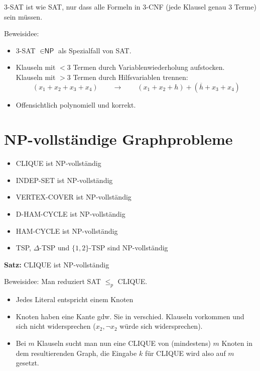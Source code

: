 \documentclass[a4paper,graphics,11pt]{article}
\begin{document}
3-SAT ist wie SAT, nur dass alle Formeln in 3-CNF (jede Klausel genau 3 Terme) sein müssen.

Beweisidee:
\begin{itemize}
    \item 3-SAT $\in \textsf{NP}$ als Spezialfall von SAT.
    \item Klauseln mit $< 3$ Termen durch Variablenwiederholung aufstocken.\\
        Klauseln mit $> 3$ Termen durch Hilfsvariablen trennen:
        $$
            (x_1 + x_2 + x_3 + x_4)
            \qquad\rightarrow\qquad
            (x_1 + x_2 + h) + (\overline{h} + x_3 + x_4)
        $$
    \item Offensichtlich polynomiell und korrekt.
\end{itemize}



\newpage



\section{\textsf{NP}-vollständige Graphprobleme}


\begin{itemize}
    \item CLIQUE ist \textsf{NP}-vollständig
    \item INDEP-SET ist \textsf{NP}-vollständig
    \item VERTEX-COVER ist \textsf{NP}-vollständig
    \item D-HAM-CYCLE ist \textsf{NP}-vollständig
    \item HAM-CYCLE ist \textsf{NP}-vollständig
    \item TSP, $\Delta$-TSP und $\{1,2\}$-TSP sind \textsf{NP}-vollständig
\end{itemize}


\textbf{Satz:} CLIQUE ist \textsf{NP}-vollständig

Beweisidee: Man reduziert SAT $\leq_p$ CLIQUE.

\begin{itemize}
    \item Jedes Literal entspricht einem Knoten
    \item Knoten haben eine Kante gdw. Sie in verschied. Klauseln vorkommen
        und sich nicht widersprechen ($x_2, \lnot x_2$ würde sich widersprechen).
    \item Bei $m$ Klauseln sucht man nun eine CLIQUE von (mindestens) $m$ Knoten in dem resultierenden Graph,
        die Eingabe $k$ für CLIQUE wird also auf $m$ gesetzt.
\end{itemize}
\end{document}
